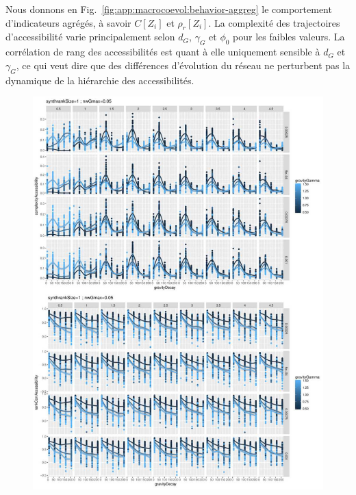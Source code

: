 Nous donnons en Fig.~\ref{fig:app:macrocoevol:behavior-aggreg} le comportement d'indicateurs agrégés, à savoir $C\left[Z_i\right]$ et $\rho_r \left[Z_i\right]$. La complexité des trajectoires d'accessibilité varie principalement selon $d_G$, $\gamma_G$ et $\phi_0$ pour les faibles valeurs. La corrélation de rang des accessibilités est quant à elle uniquement sensible à $d_G$ et $\gamma_G$, ce qui veut dire que des différences d'évolution du réseau ne perturbent pas la dynamique de la hiérarchie des accessibilités.



\begin{figure}
\includegraphics[width=\linewidth,height=0.9\textheight]{Figures/Final/A-macrocoevol-behavior-aggreg.jpg}
\end{figure}


